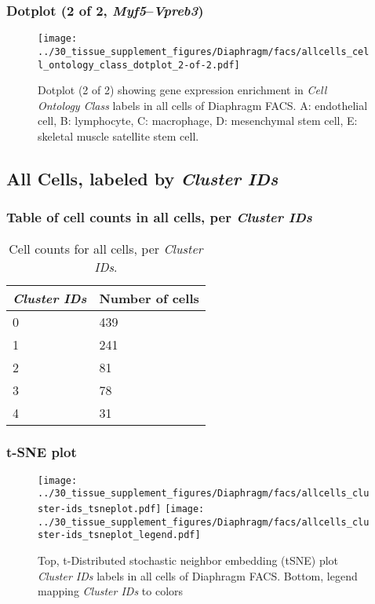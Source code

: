 \subsubsection{Dotplot (2 of 2, \emph{Myf5}--\emph{Vpreb3})}
\begin{figure}[h]
\centering
\texttt{[image: ../30\_tissue\_supplement\_figures/Diaphragm/facs/allcells\_cell\_ontology\_class\_dotplot\_2-of-2.pdf]}

\caption{ Dotplot (2 of 2)  showing gene expression enrichment in \emph{Cell Ontology Class} labels in all cells of Diaphragm FACS. A: endothelial cell, B: lymphocyte, C: macrophage, D: mesenchymal stem cell, E: skeletal muscle satellite stem cell.}
\end{figure}


\clearpage

\subsection{All Cells, labeled by \emph{Cluster IDs}}
\subsubsection{Table of cell counts in all cells, per \emph{Cluster IDs}}\begin{table}[h]
\centering
\label{my-label}
\begin{tabular}{@{}ll@{}}
\toprule

\emph{Cluster IDs}& Number of cells \\ \midrule
0 & 439 \\

1 & 241 \\

2 & 81 \\

3 & 78 \\

4 & 31 \\
\bottomrule
\end{tabular}
\caption{Cell counts for all cells, per \emph{Cluster IDs}.}
\end{table}

\clearpage
\subsubsection{t-SNE plot}
\begin{figure}[h]
\centering
\texttt{[image: ../30\_tissue\_supplement\_figures/Diaphragm/facs/allcells\_cluster-ids\_tsneplot.pdf]}
\texttt{[image: ../30\_tissue\_supplement\_figures/Diaphragm/facs/allcells\_cluster-ids\_tsneplot\_legend.pdf]}
\caption{Top, t-Distributed stochastic neighbor embedding (tSNE) plot  \emph{Cluster IDs} labels in all cells of Diaphragm FACS. Bottom, legend mapping \emph{Cluster IDs} to colors}
\end{figure}


